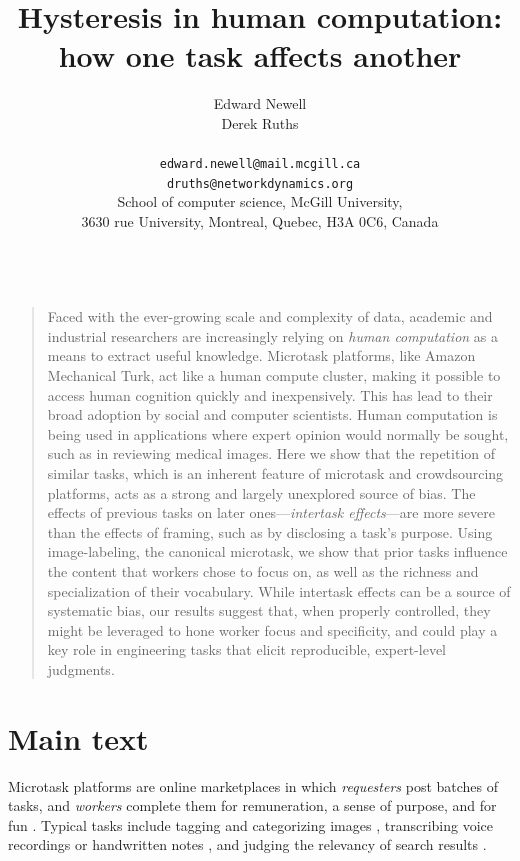 \documentclass[12pt]{article}
\title{Hysteresis in human computation:\\ how one task affects another}
\author
{Edward Newell \\ Derek Ruths\\
\\
\normalsize{\texttt{edward.newell@mail.mcgill.ca}}\\
\normalsize{\texttt{druths@networkdynamics.org}}\\
\normalsize{School of computer science, McGill University,}\\
\normalsize{3630 rue University, Montreal, Quebec, H3A 0C6, Canada}\\
\\
}
\date{}
\newenvironment{sciabstract}{%
\begin{quote} \bf}
{\end{quote}}
\begin{document}
 


\baselineskip24pt


\maketitle 




\begin{sciabstract}

Faced with the ever-growing scale and complexity of data, academic and 
industrial researchers are increasingly relying on \textit{human computation} 
as a means to extract useful knowledge.  Microtask
platforms, like Amazon Mechanical Turk, act like a human compute cluster,
making it possible to access human cognition quickly and inexpensively. 
This has lead to their broad adoption by social and computer scientists.  
Human computation is being used in applications
where expert opinion would normally be sought, such as in reviewing 
medical images.
Here we show that the repetition of similar tasks, which is an inherent
feature of microtask and crowdsourcing platforms, acts as a strong
and largely unexplored source of bias.  The effects of previous tasks on
later ones---\textit{intertask effects}---are more severe than the effects 
of framing, such as by disclosing a task's purpose.  
Using image-labeling, the canonical microtask, we show that prior 
tasks influence the content that workers chose to focus on, as well as the 
richness and specialization of their vocabulary.    
While intertask effects can be a source of systematic bias, our
results suggest that, when properly controlled, they might be leveraged
to hone worker focus and specificity, and could play a key role in engineering
tasks that elicit reproducible, expert-level judgments.
\end{sciabstract}

\section*{Main text}
Microtask platforms are online marketplaces in which \textit{requesters} 
post batches of tasks, and \textit{workers} complete them
for remuneration, a sense of purpose, and for fun
\cite{kazai2013analysis,Antin20122925}.  
Typical tasks include tagging and categorizing images 
\cite{6116320,Zhai2012357}, transcribing voice recordings 
\cite{chandler2013breaking,paolacci2010running}
or handwritten notes \cite{Berinsky2012351,Finnerty2013}, and judging the 
relevancy of search results 
\cite{le2010ensuring,grady2010crowdsourcing,alonso2009can,kazai2013analysis}.
\end{document}
